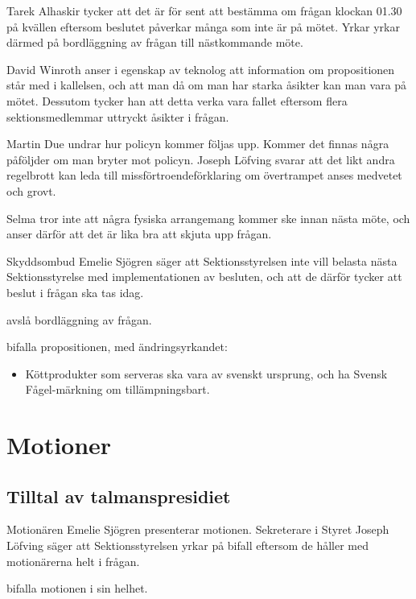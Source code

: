 \documentclass[hidelinks]{sektionsmote}
\begin{document}
Tarek Alhaskir tycker att det är för sent att bestämma om frågan klockan 01.30 på kvällen eftersom beslutet påverkar många som inte är på mötet.
Yrkar yrkar därmed på bordläggning av frågan till nästkommande möte.

David Winroth anser i egenskap av teknolog att information om propositionen står med i kallelsen, och att man då om man har starka åsikter kan man vara på mötet. Dessutom tycker han att detta verka vara fallet eftersom flera sektionsmedlemmar uttryckt åsikter i frågan.

Martin Due undrar hur policyn kommer följas upp.
Kommer det finnas några påföljder om man bryter mot policyn.
Joseph Löfving svarar att det likt andra regelbrott kan leda till missförtroendeförklaring om övertrampet anses medvetet och grovt.

Selma tror inte att några fysiska arrangemang kommer ske innan nästa möte, och anser därför att det är lika bra att skjuta upp frågan.

Skyddsombud Emelie Sjögren säger att Sektionsstyrelsen inte vill belasta nästa Sektionsstyrelse med implementationen av besluten, och att de därför tycker att beslut i frågan ska tas idag.

\begin{beslut}
  \item avslå bordläggning av frågan.
  \item bifalla propositionen, med ändringsyrkandet:
  \begin{itemize}
    \item Köttprodukter som serveras ska vara av svenskt ursprung, och ha Svensk Fågel-märkning om tillämpningsbart.
  \end{itemize}
\end{beslut}


\section{Motioner}
\subsection{Tilltal av talmanspresidiet}
Motionären Emelie Sjögren presenterar motionen. %
Sekreterare i Styret Joseph Löfving säger att Sektionsstyrelsen yrkar på bifall eftersom de håller med motionärerna helt i frågan.

\begin{beslut}
  \item bifalla motionen i sin helhet.
\end{beslut}
\end{document}
